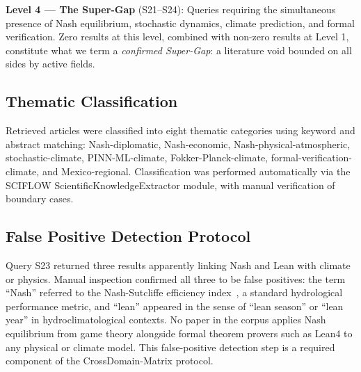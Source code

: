 \documentclass[gmd, manuscript]{copernicus}
\begin{document}
\textbf{Level 4 — The Super-Gap} (S21--S24): Queries requiring the
simultaneous presence of Nash equilibrium, stochastic dynamics, climate
prediction, and formal verification. Zero results at this level, combined
with non-zero results at Level 1, constitute what we term a
\textit{confirmed Super-Gap}: a literature void bounded on all sides
by active fields.

\subsection{Thematic Classification}

Retrieved articles were classified into eight thematic categories using
keyword and abstract matching: Nash-diplomatic, Nash-economic,
Nash-physical-atmospheric, stochastic-climate, PINN-ML-climate,
Fokker-Planck-climate, formal-verification-climate, and Mexico-regional.
Classification was performed automatically via the SCIFLOW
ScientificKnowledgeExtractor module, with manual verification of
boundary cases.

\subsection{False Positive Detection Protocol}

Query S23 returned three results apparently linking Nash and Lean with
climate or physics. Manual inspection confirmed all three to be false
positives: the term ``Nash'' referred to the Nash-Sutcliffe efficiency
index~\citep{Nash1950}, a standard hydrological performance metric, and
``lean'' appeared in the sense of ``lean season'' or ``lean year'' in
hydroclimatological contexts. No paper in the corpus applies Nash
equilibrium from game theory alongside formal theorem provers such as
Lean4 to any physical or climate model. This false-positive detection
step is a required component of the CrossDomain-Matrix protocol.
\end{document}
